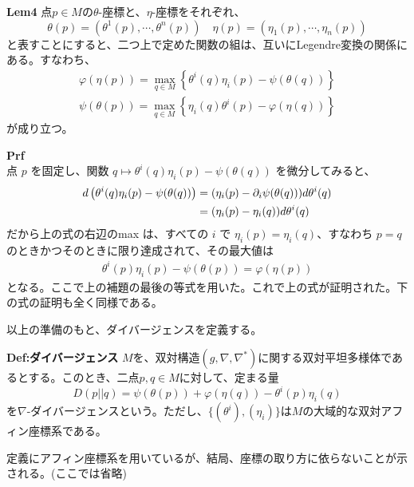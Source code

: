 \documentclass[a4paper,11pt]{jsarticle}
\numberwithin{equation}{section}
\begin{document}
    \begin{itembox}[l]{\textbf{Lem4}}
        点$p \in M$の$\theta$-座標と、$\eta$-座標をそれぞれ、
        \begin{equation}
            \theta(p) = (\theta^1(p),\cdots,\theta^n(p)) \quad \eta(p) = (\eta_1(p),\cdots,\eta_n(p))
        \end{equation}
        と表すことにすると、二つ上で定めた関数の組は、互いにLegendre変換の関係にある。すなわち、
        \begin{align}
            \varphi(\eta(p)) = \underset{q \in M}{\max} \left\{ \theta^i(q)\eta_i(p) - \psi(\theta(q)) \right\}\\
            \psi(\theta(p)) = \underset{q \in M}{\max} \left\{ \eta_i(q)\theta^i(p) - \varphi(\eta(q)) \right\}
        \end{align}
        が成り立つ。
    \end{itembox}
    \textbf{Prf}\\
    点 \(p\) を固定し、関数 \(q \mapsto \theta^i(q) \eta_i(p) - \psi(\theta(q))\) を微分してみると、
    \begin{align}
    d \left( \theta^i(q) \eta_i(p) - \psi(\theta(q)) \right) &= (\eta_i(p) - \partial_i \psi(\theta(q))) d\theta^i(q) \notag \\
    &= (\eta_i(p) - \eta_i(q)) d\theta^i(q)
    \end{align}
    だから上の式の右辺のmax は、すべての \(i\) で \(\eta_i(p) = \eta_i(q)\)、すなわち \(p = q\) のときかつそのときに限り達成されて、その最大値は
    \begin{align}
    \theta^i(p) \eta_i(p) - \psi(\theta(p)) = \varphi(\eta(p))
    \end{align}
    となる。ここで上の補題の最後の等式を用いた。これで上の式が証明された。下の式の証明も全く同様である。 \hfill\qedsymbol
    
    
    以上の準備のもと、ダイバージェンスを定義する。
    \begin{itembox}[l]{\textbf{Def:ダイバージェンス}}
        $M$を、双対構造$(g,\nabla,\nabla^*)$に関する双対平坦多様体であるとする。このとき、二点$p,q \in M$に対して、定まる量
        \begin{equation}
            D(p||q) = \psi(\theta(p)) + \varphi(\eta(q)) - \theta^i(p)\eta_i(q)
        \end{equation}
        を$\nabla$-ダイバージェンスという。ただし、$\{(\theta ^i),(\eta_i)\}$は$M$の大域的な双対アフィン座標系である。
    \end{itembox}
    定義にアフィン座標系を用いているが、結局、座標の取り方に依らないことが示される。(ここでは省略)\\
    
\end{document}
